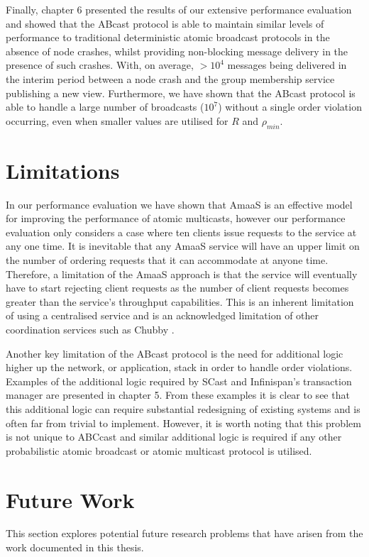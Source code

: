 Finally, chapter 6 presented the results of our extensive performance evaluation and showed that the \textsf{ABcast} protocol is able to maintain similar levels of performance to traditional deterministic atomic broadcast protocols in the absence of node crashes, whilst providing non-blocking message delivery in the presence of such crashes.  With, on average, $> 10^4$ messages being delivered in the interim period between a node crash and the group membership service publishing a new view.  Furthermore, we have shown that the \textsf{ABcast} protocol is able to handle a large number of broadcasts ($10^7$) without a single order violation occurring, even when smaller values are utilised for $R$ and $\rho_{min}$.  

\section{Limitations}\label{sec:sum_limitations}
In our performance evaluation we have shown that \textsf{AmaaS} is an effective model for improving the performance of atomic multicasts, however our performance evaluation only considers a case where ten clients issue requests to the service at any one time.  It is inevitable that any \textsf{AmaaS} service will have an upper limit on the number of ordering requests that it can accommodate at anyone time.  Therefore, a limitation of the \textsf{AmaaS} approach is that the service will eventually have to start rejecting client requests as the number of client requests becomes greater than the service's throughput capabilities.  This is an inherent limitation of using a centralised service and is an acknowledged limitation of other coordination services such as Chubby \citep{Burrows:2006:CLS:1298455.1298487}.  

Another key limitation of the \textsf{ABcast} protocol is the need for additional logic higher up the network, or application, stack in order to handle order violations.  Examples of the additional logic required by \textsf{SCast} and Infinispan's transaction manager are presented in chapter 5.  From these examples it is clear to see that this additional logic can require substantial redesigning of existing systems and is often far from trivial to implement.  However, it is worth noting that this problem is not unique to \textsf{ABCcast} and similar additional logic is required if any other probabilistic atomic broadcast or atomic multicast protocol is utilised.  

\section{Future Work}\label{sec:future_work}
This section explores potential future research problems that have arisen from the work documented in this thesis.

